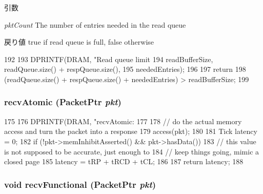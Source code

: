 \begin{DoxyParams}{引数}
\item[{\em pktCount}]The number of entries needed in the read queue \end{DoxyParams}
\begin{DoxyReturn}{戻り値}
true if read queue is full, false otherwise 
\end{DoxyReturn}



\begin{DoxyCode}
192 {
193     DPRINTF(DRAM, "Read queue limit %
194             readBufferSize, readQueue.size() + respQueue.size(),
195             neededEntries);
196 
197     return
198         (readQueue.size() + respQueue.size() + neededEntries) > readBufferSize;
199 }
\end{DoxyCode}
\hypertarget{classDRAMCtrl_a5f0b4c4a94f6b0053f9d7a4eb9c2518a}{
\subsubsection[{recvAtomic}]{ recvAtomic ({\bf PacketPtr} {\em pkt})}}
\label{classDRAMCtrl_a5f0b4c4a94f6b0053f9d7a4eb9c2518a}



\begin{DoxyCode}
175 {
176     DPRINTF(DRAM, "recvAtomic: %
177 
178     // do the actual memory access and turn the packet into a response
179     access(pkt);
180 
181     Tick latency = 0;
182     if (!pkt->memInhibitAsserted() && pkt->hasData()) {
183         // this value is not supposed to be accurate, just enough to
184         // keep things going, mimic a closed page
185         latency = tRP + tRCD + tCL;
186     }
187     return latency;
188 }
\end{DoxyCode}
\hypertarget{classDRAMCtrl_aeefa907fb6d6a787e6dab90e8138ea90}{
\subsubsection[{recvFunctional}]{\setlength{\rightskip}{0pt plus 5cm}void recvFunctional ({\bf PacketPtr} {\em pkt})}}
\label{classDRAMCtrl_aeefa907fb6d6a787e6dab90e8138ea90}



